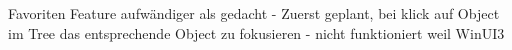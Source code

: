 
Favoriten Feature aufwändiger als gedacht
- Zuerst geplant, bei klick auf Object im Tree das entsprechende Object zu fokusieren
   - nicht funktioniert weil WinUI3